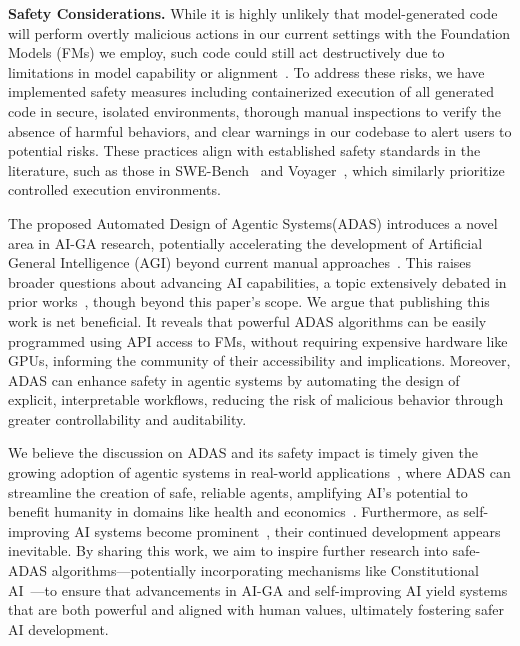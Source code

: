 \documentclass{article} %
\newcommand{\problemlong}{Automated Design of Agentic Systems\xspace}
\newcommand{\problem}{ADAS\xspace}
\begin{document}
\noindent\textbf{Safety Considerations.}\hspace{0.5em} While it is highly unlikely that model-generated code will perform overtly malicious actions in our current settings with the Foundation Models (FMs) we employ, such code could still act destructively due to limitations in model capability or alignment~\citep{rokon2020sourcefinder,chen2021evaluating}. To address these risks, we have implemented safety measures including containerized execution of all generated code in secure, isolated environments, thorough manual inspections to verify the absence of harmful behaviors, and clear warnings in our codebase to alert users to potential risks. These practices align with established safety standards in the literature, such as those in SWE-Bench~\citep{jimenez2024swebench} and Voyager~\citep{wang2023voyager}, which similarly prioritize controlled execution environments.

The proposed \problemlong (\problem) introduces a novel area in AI-GA research, potentially accelerating the development of Artificial General Intelligence (AGI) beyond current manual approaches~\citep{clune2019aigas}. This raises broader questions about advancing AI capabilities, a topic extensively debated in prior works~\citep{clune2019aigas,ecoffet2020open,bostrom2002a,yudkowsky2008artificial,bengio2024managing}, though beyond this paper’s scope. We argue that publishing this work is net beneficial. It reveals that powerful \problem algorithms can be easily programmed using API access to FMs, without requiring expensive hardware like GPUs, informing the community of their accessibility and implications. Moreover, \problem can enhance safety in agentic systems by automating the design of explicit, interpretable workflows, reducing the risk of malicious behavior through greater controllability and auditability.

We believe the discussion on \problem and its safety impact is timely given the growing adoption of agentic systems in real-world applications~\citep{turow2024}, where \problem can streamline the creation of safe, reliable agents, amplifying AI’s potential to benefit humanity in domains like health and economics~\citep{amodei2024}. Furthermore, as self-improving AI systems become prominent~\citep{clune2019aigas,fernando2024promptbreeder,lu2024discopop,zelikman2022star}, their continued development appears inevitable. By sharing this work, we aim to inspire further research into safe-\problem algorithms—potentially incorporating mechanisms like Constitutional AI~\citep{bai2022constitutional}—to ensure that advancements in AI-GA and self-improving AI yield systems that are both powerful and aligned with human values, ultimately fostering safer AI development.
\end{document}

